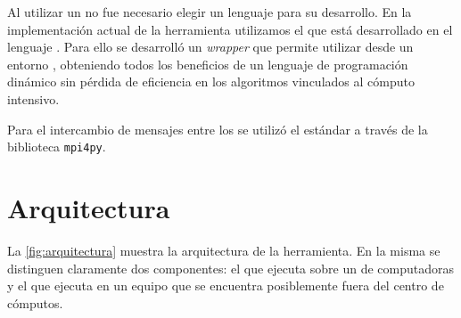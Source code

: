 Al utilizar un \ssolver \ots no fue necesario elegir un lenguaje
para su desarrollo. En la implementación actual de la herramienta utilizamos
el \ssolver \minisatdosveinte que está desarrollado en el lenguaje \cpp. Para
ello se desarrolló un \emph{wrapper} que permite utilizar \minisat desde un
entorno \Python, obteniendo todos los beneficios de un lenguaje de programación
dinámico sin pérdida de eficiencia en los algoritmos vinculados al cómputo intensivo.

Para el intercambio de mensajes entre los \ws se utilizó el
estándar \mpi a través de la biblioteca \texttt{mpi4py}\cite{mpi4py}.



\section{Arquitectura}

La \fig\ref{fig:arquitectura} muestra la arquitectura de la herramienta. En
la misma se distinguen claramente dos componentes: el \bend que ejecuta sobre
un \cluster de computadoras y el \fend que ejecuta en un equipo que se
encuentra posiblemente fuera del centro de cómputos.


